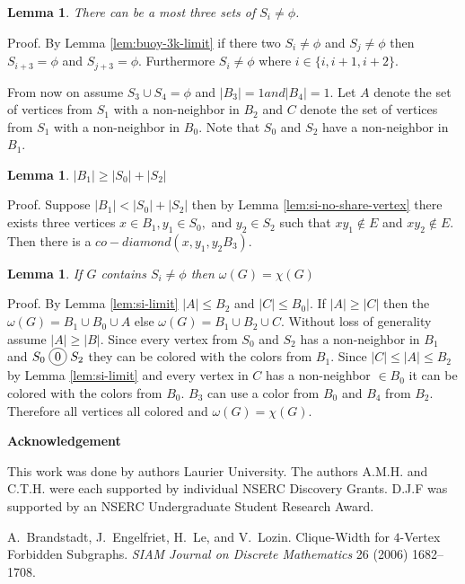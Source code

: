 \documentclass[12pt]{article}
\newcommand*\circled[1]{\tikz[baseline=(char.base)]{
            \node[shape=circle,draw,inner sep=2pt] (char) {#1};}}
\newtheorem{Lemma}[Theorem]{Lemma}
\begin{document}
\begin{Lemma}\label{lem:max-3-si}
There can be a most three sets of $S_i \neq \phi$. 
\end{Lemma}
\noindent {\it} Proof. By Lemma \ref{lem:buoy-3k-limit} if there two $S_i \neq \phi$ and $S_j \neq \phi$ then  $S_{i+3} = \phi$ and $S_{j+3} = \phi$. Furthermore $S_i \neq \phi$ where $i \in \{i, i+1, i+2\}$. 

From now on assume $S_3 \cup S_4 = \phi$ and $|B_3| = 1 and |B_4| = 1$. Let $A$ denote the set of vertices from $S_1$ with a non-neighbor in $B_2$ and $C$ denote the set of vertices from $S_1$ with a non-neighbor in $B_0$. Note that $S_0$ and $S_2$ have a non-neighbor in $B_1$.

\begin{Lemma}\label{lem:max-s0-s2}
$|B_1| \geq |S_0| + |S_2|$
\end{Lemma}
\noindent {\it} Proof. Suppose $|B_1| < |S_0| + |S_2|$ then by Lemma \ref{lem:si-no-share-vertex} there exists three vertices $x \in B_1, y_1 \in S_0,$ and $y_2 \in S_2$ such that $xy_1 \not \in E$ and $xy_2 \not \in E$. Then there is a $co-diamond (x, y_1, y_2B_3)$.

\begin{Lemma}\label{lem:omega-equals-chromatic}
If $G$ contains $S_i \neq \phi$ then $\omega(G) = \chi(G)$
\end{Lemma}
\noindent {\it} Proof. By Lemma \ref{lem:si-limit} $|A| \leq B_2$ and $|C| \leq B_0|$. If $|A| \geq |C|$ then the $\omega(G) = B_1 \cup B_0 \cup A$ else $\omega(G) = B_1 \cup B_2 \cup C$. Without loss of generality assume $|A| \geq |B|$. Since every vertex from $S_0$ and $S_2$ has a non-neighbor in $B_1$ and $S_0 \;\circled{0}\; S_2$ they can be colored with the colors from $B_1$. Since $|C| \leq |A| \leq B_2$ by Lemma \ref{lem:si-limit} and every vertex in $C$ has a non-neighbor $\in B_0$ it can be colored with the colors from $B_0$. $B_3$ can use a color from $B_0$ and $B_4$ from $B_2$. Therefore all vertices all colored and $\omega(G) = \chi(G)$.

\begin{center}
{\bf Acknowledgement}
\end{center}
This work was done by authors  Laurier University. The authors A.M.H. and C.T.H. were each supported by individual NSERC Discovery Grants. D.J.F was supported by an NSERC Undergraduate Student Research Award.


\clearpage
\begin{thebibliography}{99}


    A.~Brandstadt, J.~Engelfriet, H.~Le, and V.~Lozin. Clique-Width for $4$-Vertex Forbidden Subgraphs.  {\sl SIAM
     Journal on Discrete Mathematics} 26 (2006) 1682--1708.

\end{thebibliography}
\end{document}
